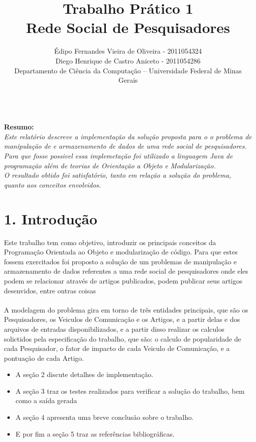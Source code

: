 \documentclass[12pt, a4paper]{article}
\begin{document}

 \title{Trabalho Prático 1 \\ Rede Social de Pesquisadores \\}
 \author{Édipo Fernandes Vieira de Oliveira - 2011054324\\ Diego Henrique de Castro Aniceto - 2011054286\\Departamento de Ciência da Computação -- Universidade Federal de Minas Gerais\\}
  \maketitle


\textbf{\textit \\Resumo: }
\textit{\\ Este relatório descreve a implementação da solução proposta para o o problema de manipulação de e armazenamento de dados de uma rede social de pesquisadores. Para que fosse possivel essa implemetação foi utilizado a linguagem Java de programação além de teorias de Orientação a Objeto e Modularização.\\
  O resultado obtido foi satisfatório, tanto em relação a solução do problema, quanto aos conceitos envolvidos.}
\section*{1. Introdução}

  Este trabalho tem como objetivo, introduzir os principais conceitos da Programação Orientada ao Objeto e modularização de código. Para que estes fossem exercitados foi proposto a solução de um problemas de manipulação e armazenamento de dados referentes a uma rede social de pesquisadores onde eles podem se relacionar através de artigos publicados, podem publicar seus artigos desenvidos, entre outras coisas \\\\
  A modelagem do problema gira em torno de três entidades principais, que são os Pesquisadores, os Veiculos de Comunicação e os Artigos, e a partir delas e dos arquivos de entradas disponibilizados, e a partir disso realizar os calculos solictidos pela especificação do trabalho, que são: o calculo de popularidade de cada Pesquisador, o fator de impacto de cada Veiculo de Comunicação, e a pontuação de cada Artigo.

  \begin{itemize}
  \item A seção 2 discute detalhes de implementação.
  \item A seção 3 traz os testes realizados para verificar a solução do trabalho, bem como a saída gerada
  \item A seção 4 apresenta uma breve conclusão sobre o trabalho.
  \item E por fim a seção 5 traz as referências bibliográficas.
\end{itemize}
\end{document}
